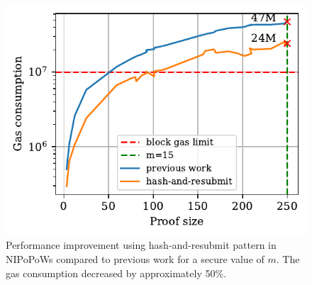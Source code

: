 \begin{figure}[!h]
    \begin{center}
        \includegraphics[width=1\columnwidth]{figures/har-nipopows.pdf}
    \end{center}
    \caption{Performance improvement using hash-and-resubmit pattern in
    NIPoPoWs compared to previous work for a secure value of $m$. The gas
    consumption decreased by approximately 50\%.}
    \label{fig:har-nipopow}
\end{figure}
